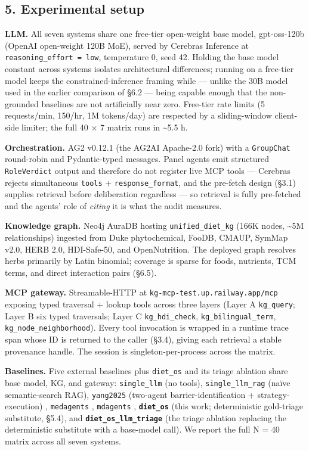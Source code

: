 \documentclass[
]{article}
\begin{document}
\hypertarget{experimental-setup}{%
\subsection{5. Experimental setup}\label{experimental-setup}}

\textbf{LLM.} All seven systems share one free-tier open-weight base
model, gpt-oss-120b (OpenAI open-weight 120B MoE), served by Cerebras
Inference at \texttt{reasoning\_effort\ =\ low}, temperature 0, seed 42.
Holding the base model constant across systems isolates architectural
differences; running on a free-tier model keeps the
constrained-inference framing while --- unlike the 30B model used in the
earlier comparison of §6.2 --- being capable enough that the
non-grounded baselines are not artificially near zero. Free-tier rate
limits (5 requests/min, 150/hr, 1M tokens/day) are respected by a
sliding-window client-side limiter; the full 40 × 7 matrix runs in
\textasciitilde5.5 h.

\textbf{Orchestration.} AG2 v0.12.1 (the AG2AI Apache-2.0 fork) with a
\texttt{GroupChat} round-robin and Pydantic-typed messages. Panel agents
emit structured \texttt{RoleVerdict} output and therefore do not
register live MCP tools --- Cerebras rejects simultaneous \texttt{tools}
+ \texttt{response\_format}, and the pre-fetch design (§3.1) supplies
retrieval before deliberation regardless --- so retrieval is fully
pre-fetched and the agents' role of \emph{citing} it is what the audit
measures.

\textbf{Knowledge graph.} Neo4j AuraDB hosting
\texttt{unified\_diet\_kg} (166K nodes, \textasciitilde5M relationships)
ingested from Duke phytochemical, FooDB, CMAUP, SymMap v2.0, HERB 2.0,
HDI-Safe-50, and OpenNutrition. The deployed graph resolves herbs
primarily by Latin binomial; coverage is sparse for foods, nutrients,
TCM terms, and direct interaction pairs (§6.5).

\textbf{MCP gateway.} Streamable-HTTP at
\texttt{kg-mcp-test.up.railway.app/mcp} exposing typed traversal +
lookup tools across three layers (Layer A \texttt{kg\_query}; Layer B
six typed traversals; Layer C \texttt{kg\_hdi\_check},
\texttt{kg\_bilingual\_term}, \texttt{kg\_node\_neighborhood}). Every
tool invocation is wrapped in a runtime trace span whose ID is returned
to the caller (§3.4), giving each retrieval a stable provenance handle.
The session is singleton-per-process across the matrix.

\textbf{Baselines.} Five external baselines plus \texttt{diet\_os} and
its triage ablation share base model, KG, and gateway:
\texttt{single\_llm} (no tools), \texttt{single\_llm\_rag} (naïve
semantic-search RAG), \texttt{yang2025} (two-agent
barrier-identification + strategy-execution) \citep{yang2025},
\texttt{medagents} \citep{medagents2024}, \texttt{mdagents}
\citep{mdagents2024}, \textbf{\texttt{diet\_os}} (this work;
deterministic gold-triage substitute, §5.4), and
\textbf{\texttt{diet\_os\_llm\_triage}} (the triage ablation replacing
the deterministic substitute with a base-model call). We report the full
N = 40 matrix across all seven systems.
\end{document}
